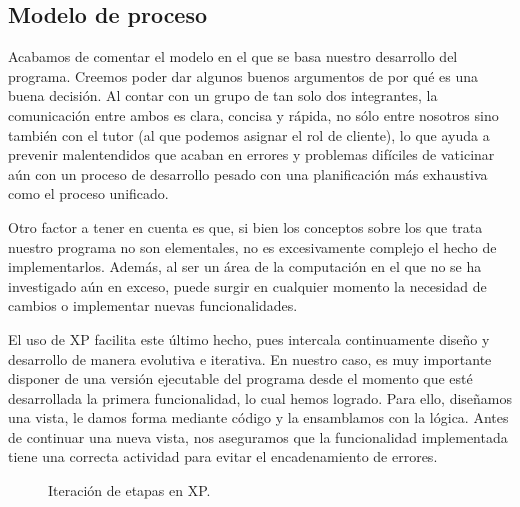 \subsection{Modelo de proceso}

Acabamos de comentar el modelo en el que se basa nuestro desarrollo del programa. Creemos poder dar algunos buenos argumentos de por qué es una buena decisión. Al contar con un grupo de tan solo dos integrantes, la comunicación entre ambos es clara, concisa y rápida, no sólo entre nosotros sino también con el tutor (al que podemos asignar el rol de cliente), lo que ayuda a prevenir malentendidos que acaban en errores y problemas difíciles de vaticinar aún con un proceso de desarrollo pesado con una planificación más exhaustiva como el proceso unificado.

Otro factor a tener en cuenta es que, si bien los conceptos sobre los que trata nuestro programa no son elementales, no es excesivamente complejo el hecho de implementarlos. Además, al ser un área de la computación en el que no se ha investigado aún en exceso, puede surgir en cualquier momento la necesidad de cambios o implementar nuevas funcionalidades.

El uso de XP facilita este último hecho, pues intercala continuamente diseño y desarrollo de manera evolutiva e iterativa. En nuestro caso, es muy importante disponer de una versión ejecutable del programa desde el momento que esté desarrollada la primera funcionalidad, lo cual hemos logrado. Para ello, diseñamos una vista, le damos forma mediante código y la ensamblamos con la lógica. Antes de continuar una nueva vista, nos aseguramos que la funcionalidad implementada tiene una correcta actividad para evitar el encadenamiento de errores.

\begin{figure}[!htb]
\begin{center}
\end{center}
\caption{Iteración de etapas en XP.}
\label{fig:fig1}
\end{figure}

